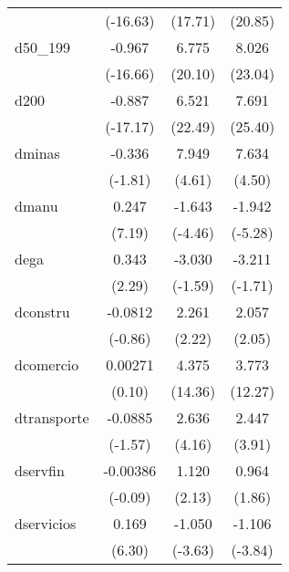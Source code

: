 {\begin{tabular}{l*{3}{c}}
            &    (-16.63)         &     (17.71)         &     (20.85)         \\
[1em]
d50\_199     &      -0.967\sym{***}&       6.775\sym{***}&       8.026\sym{***}\\
            &    (-16.66)         &     (20.10)         &     (23.04)         \\
[1em]
d200        &      -0.887\sym{***}&       6.521\sym{***}&       7.691\sym{***}\\
            &    (-17.17)         &     (22.49)         &     (25.40)         \\
[1em]
dminas      &      -0.336         &       7.949\sym{***}&       7.634\sym{***}\\
            &     (-1.81)         &      (4.61)         &      (4.50)         \\
[1em]
dmanu       &       0.247\sym{***}&      -1.643\sym{***}&      -1.942\sym{***}\\
            &      (7.19)         &     (-4.46)         &     (-5.28)         \\
[1em]
dega        &       0.343\sym{*}  &      -3.030         &      -3.211         \\
            &      (2.29)         &     (-1.59)         &     (-1.71)         \\
[1em]
dconstru    &     -0.0812         &       2.261\sym{*}  &       2.057\sym{*}  \\
            &     (-0.86)         &      (2.22)         &      (2.05)         \\
[1em]
dcomercio   &     0.00271         &       4.375\sym{***}&       3.773\sym{***}\\
            &      (0.10)         &     (14.36)         &     (12.27)         \\
[1em]
dtransporte &     -0.0885         &       2.636\sym{***}&       2.447\sym{***}\\
            &     (-1.57)         &      (4.16)         &      (3.91)         \\
[1em]
dservfin    &    -0.00386         &       1.120\sym{*}  &       0.964         \\
            &     (-0.09)         &      (2.13)         &      (1.86)         \\
[1em]
dservicios  &       0.169\sym{***}&      -1.050\sym{***}&      -1.106\sym{***}\\
            &      (6.30)         &     (-3.63)         &     (-3.84)         \\

\end{tabular}}
